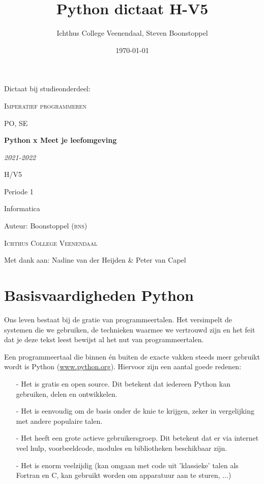 \documentclass[a4paper,11pt, fleqn]{article}
\title{Python dictaat H-V5}
\author{Ichthus College Veenendaal, Steven Boonstoppel}
\date{\today}
\newcommand{\ditwc}{Naam van het huidige werkcollege}
\begin{document}
\begin{titlepage}
	{\LARGE Dictaat bij studieonderdeel:\par}
	\vspace{1cm}
	{\scshape\LARGE Imperatief programmeren\par}
	\vspace{1cm}
	{\scshape\Large PO, SE\par}
	\vspace{2cm}
	{\Huge\bfseries Python x Meet je leefomgeving\par}
	\vspace{2cm}
	{\Large\itshape 2021-2022\par}
	\vfill
	H/V5\par
	Periode 1\par
	Informatica\par
	Auteur: Boonstoppel \textsc{(bns)}\par
	\textsc{Ichthus College Veenendaal}\par
	Met dank aan: Nadine van der Heijden \& Peter van Capel
\end{titlepage}

\tableofcontents

\clearpage
\renewcommand{\ditwc}{Basisvaardigheden Python}
\section[Basisvaardigheden Python]{\ditwc}
\label{Ch_basisvaardigheden}
Ons leven bestaat bij de gratie van programmeertalen. Het versimpelt de systemen die we gebruiken, de technieken waarmee we vertrouwd zijn en het feit dat je deze tekst leest bewijst al het nut van programmeertalen.
 
Een programmeertaal die binnen \'en buiten de exacte vakken steeds meer gebruikt wordt is Python (\url{www.python.org}). Hiervoor zijn een aantal goede redenen:
\begin{itemize}
\item[-] Het is gratis en open source. Dit betekent dat iedereen Python kan gebruiken, delen en ontwikkelen.
\item[-] Het is eenvoudig om de basis onder de knie te krijgen, zeker in vergelijking met andere populaire talen.
\item[-] Het heeft een grote actieve gebruikersgroep. Dit betekent dat er via internet veel hulp, voorbeeldcode, modules en bibliotheken beschikbaar zijn.
\item[-] Het is enorm veelzijdig (kan omgaan met code uit 'klassieke' talen als Fortran en C, kan gebruikt worden om apparatuur aan te sturen, ...)
\end{itemize}
\end{document}
